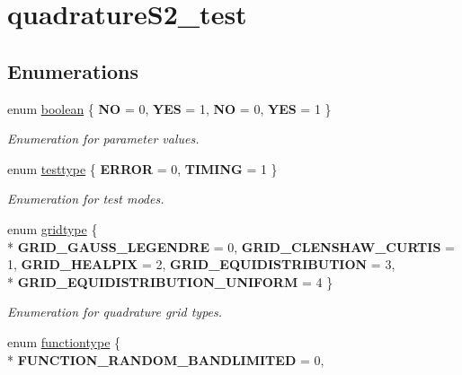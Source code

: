 \hypertarget{group__applications__quadratureS2__test}{\section{quadrature\-S2\-\_\-test}
\label{group__applications__quadratureS2__test}
}
\subsection*{Enumerations}
\begin{DoxyCompactItemize}
\item 
enum \hyperlink{group__applications__quadratureS2__test_ga7c6368b321bd9acd0149b030bb8275ed}{boolean} \{ {\bfseries N\-O} = 0, 
{\bfseries Y\-E\-S} = 1, 
{\bfseries N\-O} = 0, 
{\bfseries Y\-E\-S} = 1
 \}
\begin{DoxyCompactList}\small\item\em Enumeration for parameter values. \end{DoxyCompactList}\item 
enum \hyperlink{group__applications__quadratureS2__test_ga47f3fd319121e75dc73cd720c536f3c7}{testtype} \{ {\bfseries E\-R\-R\-O\-R} = 0, 
{\bfseries T\-I\-M\-I\-N\-G} = 1
 \}
\begin{DoxyCompactList}\small\item\em Enumeration for test modes. \end{DoxyCompactList}\item 
enum \hyperlink{group__applications__quadratureS2__test_ga4cf30b0362e85bc0154ca2c52b2bc17e}{gridtype} \{ \\*
{\bfseries G\-R\-I\-D\-\_\-\-G\-A\-U\-S\-S\-\_\-\-L\-E\-G\-E\-N\-D\-R\-E} = 0, 
{\bfseries G\-R\-I\-D\-\_\-\-C\-L\-E\-N\-S\-H\-A\-W\-\_\-\-C\-U\-R\-T\-I\-S} = 1, 
{\bfseries G\-R\-I\-D\-\_\-\-H\-E\-A\-L\-P\-I\-X} = 2, 
{\bfseries G\-R\-I\-D\-\_\-\-E\-Q\-U\-I\-D\-I\-S\-T\-R\-I\-B\-U\-T\-I\-O\-N} = 3, 
\\*
{\bfseries G\-R\-I\-D\-\_\-\-E\-Q\-U\-I\-D\-I\-S\-T\-R\-I\-B\-U\-T\-I\-O\-N\-\_\-\-U\-N\-I\-F\-O\-R\-M} = 4
 \}
\begin{DoxyCompactList}\small\item\em Enumeration for quadrature grid types. \end{DoxyCompactList}\item 
enum \hyperlink{group__applications__quadratureS2__test_gaa7c9498e1664b6773fd8f9d850921e20}{functiontype} \{ \\*
{\bfseries F\-U\-N\-C\-T\-I\-O\-N\-\_\-\-R\-A\-N\-D\-O\-M\-\_\-\-B\-A\-N\-D\-L\-I\-M\-I\-T\-E\-D} = 0, 

\end{DoxyCompactItemize}
